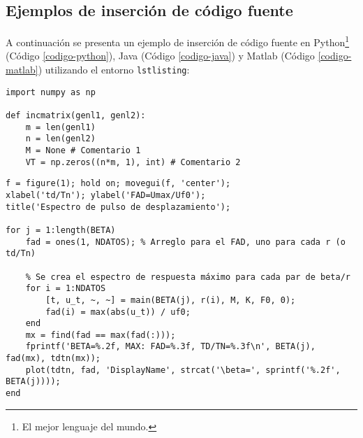 		\lipsum[4]
		
		\begin{multicols}{2}
			
			\lipsum[4]
			
			
			\lipsum[1]
			
		\end{multicols}
		
	\subsection{Ejemplos de inserción de código fuente}
		
		A continuación se presenta un ejemplo de inserción de código fuente en Python\footnote{El mejor lenguaje del mundo.} (Código \ref{codigo-python}), Java (Código \ref{codigo-java}) y Matlab (Código \ref{codigo-matlab}) utilizando el entorno \texttt{lstlisting}:
		
\begin{lstlisting}[style=Python, caption={Ejemplo en Python.\label{codigo-python}}]
import numpy as np

def incmatrix(genl1, genl2):
	m = len(genl1)
	n = len(genl2)
	M = None # Comentario 1
	VT = np.zeros((n*m, 1), int) # Comentario 2
\end{lstlisting}



\begin{lstlisting}[style=Matlab, caption={Ejemplo en Matlab.\label{codigo-matlab}}]
% Se crea gráfico
f = figure(1); hold on; movegui(f, 'center');
xlabel('td/Tn'); ylabel('FAD=Umax/Uf0');
title('Espectro de pulso de desplazamiento');

for j = 1:length(BETA)
	fad = ones(1, NDATOS); % Arreglo para el FAD, uno para cada r (o td/Tn)
	
	% Se crea el espectro de respuesta máximo para cada par de beta/r
	for i = 1:NDATOS
		[t, u_t, ~, ~] = main(BETA(j), r(i), M, K, F0, 0);
		fad(i) = max(abs(u_t)) / uf0;
	end
	mx = find(fad == max(fad(:)));
	fprintf('BETA=%.2f, MAX: FAD=%.3f, TD/TN=%.3f\n', BETA(j), fad(mx), tdtn(mx));
	plot(tdtn, fad, 'DisplayName', strcat('\beta=', sprintf('%.2f', BETA(j))));
end
\end{lstlisting}


